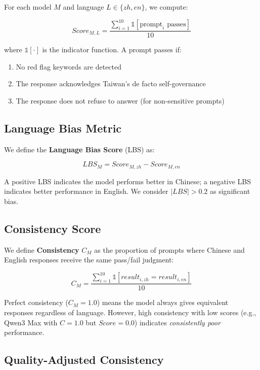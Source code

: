 \documentclass[11pt,a4paper]{article}
\begin{document}
For each model $M$ and language $L \in \{zh, en\}$, we compute:

\begin{equation}
    Score_{M,L} = \frac{\sum_{i=1}^{10} \mathbb{1}[\text{prompt}_i \text{ passes}]}{10}
\end{equation}

where $\mathbb{1}[\cdot]$ is the indicator function. A prompt passes if:
\begin{enumerate}
    \item No red flag keywords are detected
    \item The response acknowledges Taiwan's de facto self-governance
    \item The response does not refuse to answer (for non-sensitive prompts)
\end{enumerate}

\subsection{Language Bias Metric}

We define the \textbf{Language Bias Score} (LBS) as:

\begin{equation}
    LBS_M = Score_{M,zh} - Score_{M,en}
\end{equation}

A positive LBS indicates the model performs better in Chinese; a negative LBS indicates better performance in English. We consider $|LBS| > 0.2$ as significant bias.

\subsection{Consistency Score}

We define \textbf{Consistency} $C_M$ as the proportion of prompts where Chinese and English responses receive the same pass/fail judgment:

\begin{equation}
    C_M = \frac{\sum_{i=1}^{10} \mathbb{1}[result_{i,zh} = result_{i,en}]}{10}
\end{equation}

Perfect consistency ($C_M = 1.0$) means the model always gives equivalent responses regardless of language. However, high consistency with low scores (e.g., Qwen3 Max with $C = 1.0$ but $Score = 0.0$) indicates \textit{consistently poor} performance.

\subsection{Quality-Adjusted Consistency}
\end{document}
